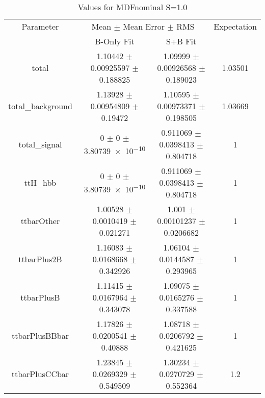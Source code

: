 \begin{table}
\centering
\caption{Values for MDFnominal S=1.0}
\begin{tabular}{cccc}
\toprule
Parameter & \multicolumn{2}{c}{Mean $\pm$ Mean Error $\pm$ RMS} & Expectation\\
 & B-Only Fit & S+B Fit & \\
\midrule
total & \num{1.10442} $\pm$ \num{0.00925597} $\pm$ \num{0.188825} & \num{1.09999} $\pm$ \num{0.00926568} $\pm$ \num{0.189023} & \num{1.03501}\\
total\_background & \num{1.13928} $\pm$ \num{0.00954809} $\pm$ \num{0.19472} & \num{1.10595} $\pm$ \num{0.00973371} $\pm$ \num{0.198505} & \num{1.03669}\\
total\_signal & \num{0} $\pm$ \num{0} $\pm$ \num{3.80739e-10} & \num{0.911069} $\pm$ \num{0.0398413} $\pm$ \num{0.804718} & \num{1}\\
ttH\_hbb & \num{0} $\pm$ \num{0} $\pm$ \num{3.80739e-10} & \num{0.911069} $\pm$ \num{0.0398413} $\pm$ \num{0.804718} & \num{1}\\
ttbarOther & \num{1.00528} $\pm$ \num{0.0010419} $\pm$ \num{0.021271} & \num{1.001} $\pm$ \num{0.00101237} $\pm$ \num{0.0206682} & \num{1}\\
ttbarPlus2B & \num{1.16083} $\pm$ \num{0.0168668} $\pm$ \num{0.342926} & \num{1.06104} $\pm$ \num{0.0144587} $\pm$ \num{0.293965} & \num{1}\\
ttbarPlusB & \num{1.11415} $\pm$ \num{0.0167964} $\pm$ \num{0.343078} & \num{1.09075} $\pm$ \num{0.0165276} $\pm$ \num{0.337588} & \num{1}\\
ttbarPlusBBbar & \num{1.17826} $\pm$ \num{0.0200541} $\pm$ \num{0.40888} & \num{1.08718} $\pm$ \num{0.0206792} $\pm$ \num{0.421625} & \num{1}\\
ttbarPlusCCbar & \num{1.23845} $\pm$ \num{0.0269329} $\pm$ \num{0.549509} & \num{1.30234} $\pm$ \num{0.0270729} $\pm$ \num{0.552364} & \num{1.2}\\
\bottomrule
\end{tabular}
\end{table}